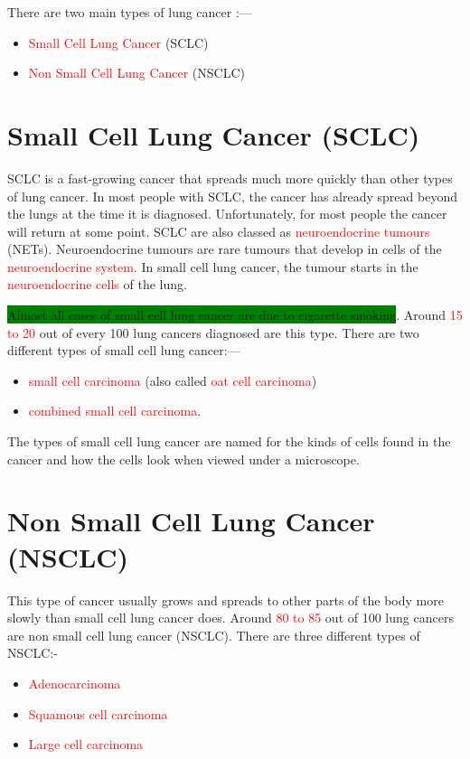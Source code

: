 There are two main types of lung cancer :---
\begin{itemize}
    \item \textcolor{red}{Small Cell Lung Cancer} (SCLC)
    \item \textcolor{red}{Non Small Cell Lung Cancer} (NSCLC)    
\end{itemize}
\section {Small Cell Lung Cancer (SCLC)}

SCLC is a fast-growing cancer that spreads much more quickly than other types of lung cancer. In most people with SCLC, the cancer has already spread beyond the lungs at the time it is diagnosed. Unfortunately, for most people the cancer will return at some point. SCLC are also classed as \textcolor{red}{neuroendocrine tumours} (NETs). Neuroendocrine tumours are rare tumours that develop in cells of the \textcolor{red}{neuroendocrine system}. In small cell lung cancer, the tumour starts in the \textcolor{red}{neuroendocrine cells} of the lung.

\colorbox{green}{Almost all cases of small cell lung cancer are due to cigarette smoking}. Around \textcolor{red}{15 to 20} out of every 100 lung cancers diagnosed are this type. There are two different types of small cell lung cancer:--- 

\begin{itemize}
    \item \textcolor{red}{small cell carcinoma} (also called \textcolor{red}{oat cell carcinoma})
    \item \textcolor{red}{combined small cell carcinoma}.
\end{itemize}

The types of small cell lung cancer are named for the kinds of cells found in the cancer and how the cells look when viewed under a microscope. 

\section{Non Small Cell Lung Cancer (NSCLC)} 
This type of cancer usually grows and spreads to other parts of the body more slowly than small cell lung cancer does. Around \textcolor{red}{80 to 85} out of 100 lung cancers are non small cell lung cancer (NSCLC). There are three different types of NSCLC:-
\begin{itemize}
    \item \textcolor{red}{Adenocarcinoma}
    \item \textcolor{red}{Squamous cell carcinoma}
    \item \textcolor{red}{Large cell carcinoma}
\end{itemize}

